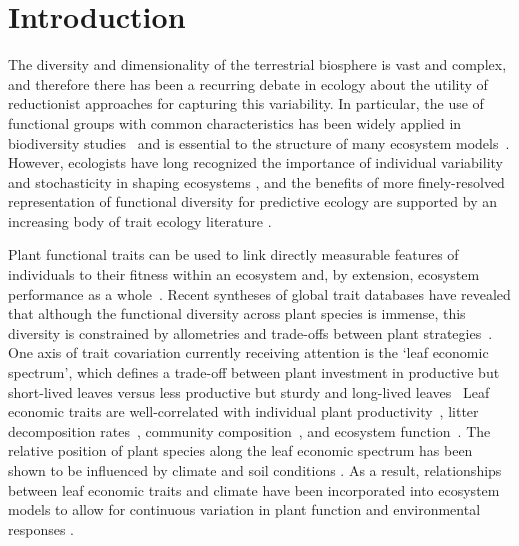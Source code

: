 \section{Introduction}\label{sec:mvtraits-intro}

The diversity and dimensionality of the terrestrial biosphere is vast and complex, and therefore there has been a recurring debate in ecology about the utility of reductionist approaches for capturing this variability.
In particular, the use of functional groups with common characteristics has been widely applied in biodiversity studies~\cite{naeem_disentangling_2003} and is essential to the structure of many ecosystem models~\cite{lavorel_plant_1997,wullschleger_plant_2014}.
However, ecologists have long recognized the importance of individual variability and stochasticity in shaping ecosystems%
\cite{gleason_individualistic_1926,bolnick_why_2011,rosindell_unified_2011,clark_why_2016},
and the benefits of more finely-resolved representation of functional diversity for predictive ecology are supported by an increasing body of trait ecology literature%
\cite{mayfield_diversity_2006,mcmahon_improving_2011,van_bodegom_going_2012,reichstein_linking_2014,violle_emergence_2014,medlyn_using_2015,moran_intraspecific_2016}.

Plant functional traits can be used to link directly measurable features of individuals to their fitness within an ecosystem and, by extension, ecosystem performance as a whole~\cite{violle_2007_concept}.
Recent syntheses of global trait databases have revealed that although the functional diversity across plant species is immense, this diversity is constrained by allometries and trade-offs between plant strategies~\cite{wright_worldwide_2004,kattge_try_2011,kleyer_why_2015,diaz_global_2016}.
One axis of trait covariation currently receiving attention is the ‘leaf economic spectrum’, which defines a trade-off between plant investment in productive but short-lived leaves versus less productive but sturdy and long-lived leaves~\cite{wright_worldwide_2004,shipley_fundamental_2006,reich_world-wide_2014,diaz_global_2016}
Leaf economic traits are well-correlated with
individual plant productivity~\cite{shipley_functional_2005,niinemets_within-canopy_2016,wu_convergence_2016},
litter decomposition rates~\cite{bakker_leaf_2011,hobbie_plant_2015},
community composition~\cite{burns_patterns_2004,cavender-bares_multiple_2004},
and ecosystem function~\cite{diaz_plant_2004,musavi_imprint_2015}.
The relative position of plant species along the leaf economic spectrum has been shown to be influenced by climate and soil conditions%
\cite{wright_worldwide_2004,wright_modulation_2005,cornwell_community_2009,ordonez_global_2009,wigley_leaf_2016}.
As a result, relationships between leaf economic traits and climate have been incorporated into ecosystem models to allow for continuous variation in plant function and environmental responses%
\cite{sakschewski_leaf_2015,verheijen_inclusion_2015}.

